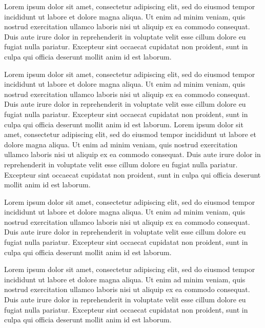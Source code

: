 \documentclass[color, font]{sop}
\begin{document}
Lorem ipsum dolor sit amet, consectetur adipiscing elit, sed do eiusmod tempor incididunt ut labore et dolore magna aliqua. Ut enim ad minim veniam, quis nostrud exercitation ullamco laboris nisi ut aliquip ex ea commodo consequat. Duis aute irure dolor in reprehenderit in voluptate velit esse cillum dolore eu fugiat nulla pariatur. Excepteur sint occaecat cupidatat non proident, sunt in culpa qui officia deserunt mollit anim id est laborum.

Lorem ipsum dolor sit amet, consectetur adipiscing elit, sed do eiusmod tempor incididunt ut labore et dolore magna aliqua. Ut enim ad minim veniam, quis nostrud exercitation ullamco laboris nisi ut aliquip ex ea commodo consequat. Duis aute irure dolor in reprehenderit in voluptate velit esse cillum dolore eu fugiat nulla pariatur. Excepteur sint occaecat cupidatat non proident, sunt in culpa qui officia deserunt mollit anim id est laborum. Lorem ipsum dolor sit amet, consectetur adipiscing elit, sed do eiusmod tempor incididunt ut labore et dolore magna aliqua. Ut enim ad minim veniam, quis nostrud exercitation ullamco laboris nisi ut aliquip ex ea commodo consequat. Duis aute irure dolor in reprehenderit in voluptate velit esse cillum dolore eu fugiat nulla pariatur. Excepteur sint occaecat cupidatat non proident, sunt in culpa qui officia deserunt mollit anim id est laborum.

Lorem ipsum dolor sit amet, consectetur adipiscing elit, sed do eiusmod tempor incididunt ut labore et dolore magna aliqua. Ut enim ad minim veniam, quis nostrud exercitation ullamco laboris nisi ut aliquip ex ea commodo consequat. Duis aute irure dolor in reprehenderit in voluptate velit esse cillum dolore eu fugiat nulla pariatur. Excepteur sint occaecat cupidatat non proident, sunt in culpa qui officia deserunt mollit anim id est laborum.

Lorem ipsum dolor sit amet, consectetur adipiscing elit, sed do eiusmod tempor incididunt ut labore et dolore magna aliqua. Ut enim ad minim veniam, quis nostrud exercitation ullamco laboris nisi ut aliquip ex ea commodo consequat. Duis aute irure dolor in reprehenderit in voluptate velit esse cillum dolore eu fugiat nulla pariatur. Excepteur sint occaecat cupidatat non proident, sunt in culpa qui officia deserunt mollit anim id est laborum.
\end{document}
